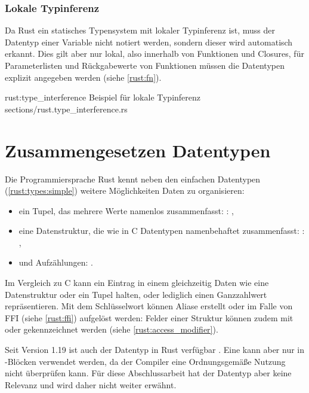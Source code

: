 \subsubsection{Lokale Typinferenz}

Da Rust ein statisches Typensystem mit lokaler Typinferenz ist, muss der Datentyp einer Variable nicht notiert werden, sondern dieser wird automatisch erkannt.
Dies gilt aber nur lokal, also innerhalb von Funktionen und Closures, für Parameterlisten und Rückgabewerte von Funktionen müssen die Datentypen explizit angegeben werden (siehe \autoref{rust:fn}).

\rustcinclude
	{rust:type_interference}
	{Beispiel für lokale Typinferenz}
	{sections/rust.type_interference.rs}
	



\section{Zusammengesetzen Datentypen}
\label{rust:types:composed}

Die Programmiersprache Rust kennt neben den einfachen Datentypen (\autoref{rust:types:simple}) weitere Möglichkeiten Daten zu organisieren:
\begin{itemize}
	\item ein Tupel, das mehrere Werte namenlos zusammenfasst: : ,
	\item eine Datenstruktur, die wie in C Datentypen namenbehaftet zusammenfasst: \linebreak{}: ,
	\item und Aufzählungen: .
\end{itemize}

Im Vergleich zu C kann ein Eintrag in einem  gleichzeitig Daten wie eine Datenstruktur oder ein Tupel halten, oder lediglich einen Ganzzahlwert repräsentieren.
Mit dem  Schlüsselwort können Aliase erstellt oder im Falle von FFI (siehe \autoref{rust:ffi}) aufgelöst werden: 
Felder einer Struktur können zudem mit  oder  gekennzeichnet werden (siehe \autoref{rust:access_modifier}).

Seit Version 1.19 ist auch der Datentyp  in Rust verfügbar \cite{rust:v1.19}.
Eine  kann aber nur in -Blöcken verwendet werden, da der Compiler eine Ordnungsgemäße Nutzung nicht überprüfen kann.
Für diese Abschlussarbeit hat der Datentyp aber keine Relevanz und wird daher nicht weiter erwähnt.

